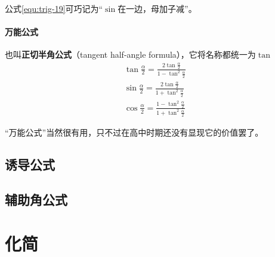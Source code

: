 公式\eqref{equ:trig-19}可巧记为“$\sin$在一边，母加子减”。

\paragraph{万能公式}
也叫\textbf{正切半角公式}（tangent half-angle formula），它将名称都统一为$\tan$
\begin{gather}
    \tan\frac{\alpha}{2}=\frac{2\tan\frac{\alpha}{2}}{1-\tan^2\frac{\alpha}{2}} \label{equ:trig-20} \\
    \sin\frac{\alpha}{2}=\frac{2\tan\frac{\alpha}{2}}{1+\tan^2\frac{\alpha}{2}} \label{equ:trig-21} \\
    \cos\frac{\alpha}{2}=\frac{1-\tan^2\frac{\alpha}{2}}{1+\tan^2\frac{\alpha}{2}} \label{equ:trig-22}
\end{gather}

“万能公式”当然很有用，只不过在高中时期还没有显现它的价值罢了。

\subsection{诱导公式}
\subsection{辅助角公式}

\section{化简}
